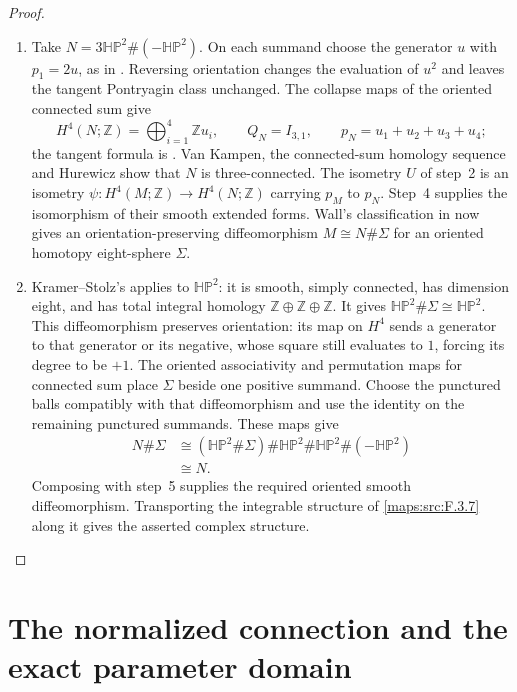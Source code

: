 \begin{proof}
\begin{enumerate}[label=\arabic*.]
\item Take $N=3\mathbb H\mathbb P^2\#(-\mathbb H\mathbb P^2)$.
On each summand choose the generator $u$ with $p_1=2u$, as in
\cite[Lemma~2.1, p.~5]{ffMandal}. Reversing orientation changes
the evaluation of $u^2$ and leaves the tangent Pontryagin class
unchanged. The collapse maps of the oriented connected sum give
\[
H^4(N;\mathbb Z)=\bigoplus_{i=1}^4\mathbb Z u_i,
\qquad Q_N=I_{3,1},\qquad p_N=u_1+u_2+u_3+u_4;
\]
the tangent formula is
\cite[Theorem~2.4, p.~7]{ffMandal}.
Van Kampen, the connected-sum homology sequence and Hurewicz show
that $N$ is three-connected. The isometry $U$ of step~2 is an
isometry $\psi:H^4(M;\mathbb Z)\to H^4(N;\mathbb Z)$ carrying
$p_M$ to $p_N$. Step~4 supplies the isomorphism of their smooth
extended forms. Wall's classification in
\cite[Theorem~3.7(1), pp.~13--14]{IVVWallForm} now gives an
orientation-preserving diffeomorphism
$M\cong N\#\Sigma$ for an oriented homotopy eight-sphere $\Sigma$.

\item Kramer--Stolz's
\cite[Theorem~A, p.~178]{IVVKramerStolz} applies to
$\mathbb H\mathbb P^2$: it is smooth, simply connected, has dimension
eight, and has total integral homology $\mathbb Z\oplus\mathbb Z
\oplus\mathbb Z$. It gives
$\mathbb H\mathbb P^2\#\Sigma\cong\mathbb H\mathbb P^2$.
This diffeomorphism preserves orientation: its map on $H^4$ sends
a generator to that generator or its negative, whose square still
evaluates to $1$, forcing its degree to be $+1$.
The oriented associativity and permutation maps for connected sum
place $\Sigma$ beside one positive summand. Choose the punctured
balls compatibly with that diffeomorphism and use the identity on
the remaining punctured summands. These maps give
\[
\begin{aligned}
N\#\Sigma
&\cong(\mathbb H\mathbb P^2\#\Sigma)\#\mathbb H\mathbb P^2
       \#\mathbb H\mathbb P^2\#(-\mathbb H\mathbb P^2)\\
&\cong N.
\end{aligned}
\]
Composing with step~5 supplies the required oriented smooth
diffeomorphism. Transporting the integrable structure of
\cref{maps:src:F.3.7} along it gives the asserted complex structure.
\end{enumerate}
\end{proof}


\section{The normalized connection and the exact parameter domain}



